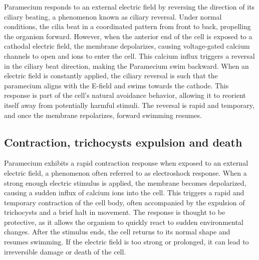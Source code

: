 Paramecium responds to an external electric field by reversing the direction of its ciliary beating, a phenomenon known as ciliary reversal. Under normal conditions, the cilia beat in a coordinated pattern from front to back, propelling the organism forward. However, when the anterior end of the cell is exposed to a cathodal electric field, the membrane depolarizes, causing voltage-gated calcium channels to open and  ions to enter the cell. This calcium influx triggers a reversal in the ciliary beat direction, making the Paramecium swim backward. When an electric field is constantly applied, the ciliary reversal is such that the paramecium aligns with the E-field and swims towards the cathode. This response is part of the cell’s natural avoidance behavior, allowing it to reorient itself away from potentially harmful stimuli. The reversal is rapid and temporary, and once the membrane repolarizes, forward swimming resumes. \cite{naitoh1972}



\subsection{Contraction, trichocysts expulsion and death}

Paramecium exhibits a rapid contraction response when exposed to an external electric field, a phenomenon often referred to as electroshock response. When a strong enough electric stimulus is applied, the membrane becomes depolarized, causing a sudden influx of calcium ions into the cell. This triggers a rapid and temporary contraction of the cell body, often accompanied by the expulsion of trichocysts and a brief halt in movement. The response is thought to be protective, as it allows the organism to quickly react to sudden environmental changes. After the stimulus ends, the cell returns to its normal shape and resumes swimming. If the electric field is too strong or prolonged, it can lead to irreversible damage or death of the cell. \cite{naitoh1969}


